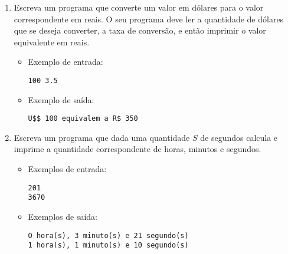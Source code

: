 \documentclass{report}
\begin{document}
\begin{enumerate}


\item Escreva um programa que converte um valor em dólares
	para o valor correspondente em reais. O seu programa deve
	ler a quantidade de dólares que se deseja converter, a taxa
	de conversão, e então imprimir o valor equivalente em reais.
\begin{itemize}
	\item Exemplo de entrada:
\begin{verbatim}
100 3.5
\end{verbatim}
	\item Exemplo de saída:
\begin{verbatim}
U$$ 100 equivalem a R$ 350 
\end{verbatim}
\end{itemize}


\item Escreva um programa que dada uma quantidade $S$ de
	segundos calcula e imprime a quantidade correspondente
	de horas, minutos e segundos.
\begin{itemize}
	\item Exemplos de entrada:
\begin{verbatim}
201
3670
\end{verbatim}
	\item Exemplos de saída:
\begin{verbatim}
O hora(s), 3 minuto(s) e 21 segundo(s) 
1 hora(s), 1 minuto(s) e 10 segundo(s)
\end{verbatim}
\end{itemize}


\begin{comment}
\item Considere que um caixa de supermercado possui notas de R\$ 50,
R\$ 20, R\$ 10, R\$ 5 e R\$ 1. Escreva um programa que lê um valor
inteiro, que representa o troco que o caixa deve dar, e calcula o
menor número de notas que o caixa deve utilizar para obter esse valor.
O programa deve mostrar o número de notas de cada valor que serão
utilizados para fornecer o troco.
\begin{itemize}
	\item Exemplo de entrada:
\begin{verbatim}
87
\end{verbatim}
	\item Exemplo de saída:
\begin{verbatim}
1 nota(s) de R$ 50
1 nota(s) de R$ 20
1 nota(s) de R$ 10
1 nota(s) de R$  5
2 nota(s) de R$  1
\end{verbatim}
\end{itemize}
\end{comment}
\end{enumerate}
\end{document}
